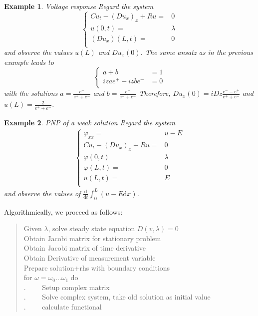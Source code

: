 \documentclass[12pt]{amsproc}
\newtheorem{example}{Example}
\begin{document}
\begin{example}{Voltage response}
Regard the system
  \begin{equation*}
    \begin{cases}
      Cu_t - (Du_x)_x + Ru=&0\\
      u(0,t)=&\lambda\\
      (Du_x)(L,t)=&0\\
    \end{cases}
  \end{equation*}
  and observe the values $u(L)$ and $Du_x(0)$.
The same ansatz as in the previous example leads to 
\begin{equation*}
  \begin{cases}
    a+b&=1\\
    izae^+-izbe^-&=0\\
  \end{cases}
\end{equation*}
with the solutions $a=\frac{e^-}{e^++e^-}$ and $b=\frac{e^+}{e^++e^-}$
Therefore,  $Du_x(0)=iDz\frac{e^--e^+}{e^++e^-}$ and
$u(L)=\frac2{e^++e^-}$.
\end{example}

\begin{example}{PNP of a weak solution}
Regard the system
  \begin{align*}
    \begin{cases}
      \varphi_{xx} =& u - E\\
      Cu_t - (Du_x)_x + Ru=&0\\
      \varphi(0,t)=&\lambda\\
      \varphi(L,t)=&0\\
      u(L,t)=&E\\
    \end{cases}
  \end{align*}
  and observe the values of $\frac{\mathrm{d}}{\mathrm{d}t} \int_0^L( u - E \mathrm{d}x)$.
\end{example}


Algorithmically, we proceed as follows:
\begin{quotation}
\parindent0pt
Given $\lambda$, solve steady state equation $D(v,\lambda)=0$\\
Obtain Jacobi matrix for stationary problem \\%
Obtain Jacobi matrix of time derivative\\ %
Obtain Derivative of measurement variable\\ %

Prepare solution+rhs with boundary conditions\\
for $\omega=\omega_0\dots\omega_1$ do\\
.~~~~ Setup complex matrix\\
.~~~~ Solve complex system, take old solution as initial value\\
.~~~~ calculate functional\\
\end{quotation}
\end{document}
